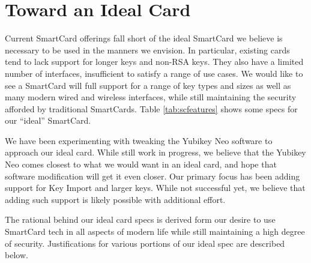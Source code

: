 \documentclass[11pt, twocolumn]{article}
\begin{document}
\section{Toward an Ideal Card}
\label{sec:ideal}

Current SmartCard offerings fall short of the ideal SmartCard we
believe is necessary to be used in the manners we envision. In
particular, existing cards tend to lack support for longer keys and
non-RSA keys. They also have a limited number of interfaces,
insufficient to satisfy a range of use cases. We would like to see a
SmartCard will full support for a range of key types and sizes as well
as many modern wired and wireless interfaces, while still maintaining
the security afforded by traditional SmartCards. Table \ref{tab:scfeatures}
shows some specs for our ``ideal'' SmartCard.

We have been experimenting with tweaking the Yubikey Neo software to
approach our ideal card. While still work in progress, we believe that
the Yubikey Neo comes closest to what we would want in an ideal card,
and hope that software modification will get it even closer. Our
primary focus has been adding support for Key Import and larger
keys. While not successful yet, we believe that adding such support is
likely possible with additional effort.

The rational behind our ideal card specs is derived form our desire to
use SmartCard tech in all aspects of modern life while still
maintaining a high degree of security. Justifications for various
portions of our ideal spec are described below.
\end{document}
